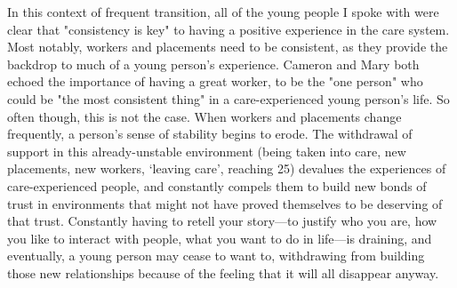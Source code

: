 In this context of frequent transition, all of the young people I spoke with were clear that "consistency is key" to having a positive experience in the care system. Most notably, workers and placements need to be consistent, as they provide the backdrop to much of a young person’s experience. Cameron and Mary both echoed the importance of having a great worker, to be the "one person" who could be "the most consistent thing" in a care-experienced young person's life. So often though, this is not the case. When workers and placements change frequently, a person’s sense of stability begins to erode. The withdrawal of support in this already-unstable environment (being taken into care, new placements, new workers, `leaving care', reaching 25) devalues the experiences of care-experienced people, and constantly compels them to build new bonds of trust in environments that might not have proved themselves to be deserving of that trust. Constantly having to retell your story—to justify who you are, how you like to interact with people, what you want to do in life—is draining, and eventually, a young person may cease to want to, withdrawing from building those new relationships because of the feeling that it will all disappear anyway.

